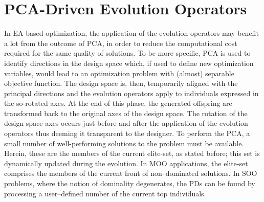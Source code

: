 \section{PCA-Driven Evolution Operators} 
In EA-based optimization, the application of the evolution operators may benefit a lot from the outcome of PCA, in order to reduce the computational cost required for the same quality of solutions. To be more specific, PCA is used to identify directions in the design space which, if used to define new optimization variables, would lead to an optimization problem with (almost) separable objective function. The design space is, then, temporarily aligned with the principal directions and the evolution operators apply to individuals expressed in the so-rotated axes. At the end of this phase, the generated offspring are transformed back to the original axes of the design space. The rotation of the design space axes occurs just before and after the application of the evolution operators thus deeming it transparent to the designer. To perform the PCA, a small number of well-performing solutions to the problem must be available. Herein, these are the members of the current elite-set, as stated before; this set is dynamically updated during the evolution. In MOO applications, the elite-set comprises the members of the current front of non--dominated solutions. In SOO problems, where the notion of dominality degenerates, the PDs  can be found by processing a user--defined number of the current top individuals. 

